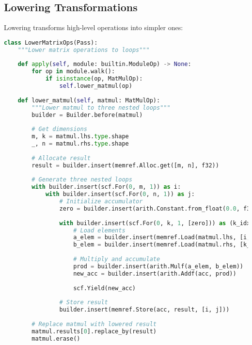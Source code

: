 \documentclass[11pt,a4paper]{article}
\begin{document}
\subsection{Lowering Transformations}

Lowering transforms high-level operations into simpler ones:

\begin{lstlisting}[language=Python, caption=Lowering High-Level Operations]
class LowerMatrixOps(Pass):
    """Lower matrix operations to loops"""
    
    def apply(self, module: builtin.ModuleOp) -> None:
        for op in module.walk():
            if isinstance(op, MatMulOp):
                self.lower_matmul(op)
    
    def lower_matmul(self, matmul: MatMulOp):
        """Lower matmul to three nested loops"""
        builder = Builder.before(matmul)
        
        # Get dimensions
        m, k = matmul.lhs.type.shape
        _, n = matmul.rhs.type.shape
        
        # Allocate result
        result = builder.insert(memref.Alloc.get([m, n], f32))
        
        # Generate three nested loops
        with builder.insert(scf.For(0, m, 1)) as i:
            with builder.insert(scf.For(0, n, 1)) as j:
                # Initialize accumulator
                zero = builder.insert(arith.Constant.from_float(0.0, f32))
                
                with builder.insert(scf.For(0, k, 1, [zero])) as (k_idx, acc):
                    # Load elements
                    a_elem = builder.insert(memref.Load(matmul.lhs, [i, k_idx]))
                    b_elem = builder.insert(memref.Load(matmul.rhs, [k_idx, j]))
                    
                    # Multiply and accumulate
                    prod = builder.insert(arith.Mulf(a_elem, b_elem))
                    new_acc = builder.insert(arith.Addf(acc, prod))
                    
                    scf.Yield(new_acc)
                
                # Store result
                builder.insert(memref.Store(acc, result, [i, j]))
        
        # Replace matmul with lowered result
        matmul.results[0].replace_by(result)
        matmul.erase()
\end{lstlisting}
\end{document}
